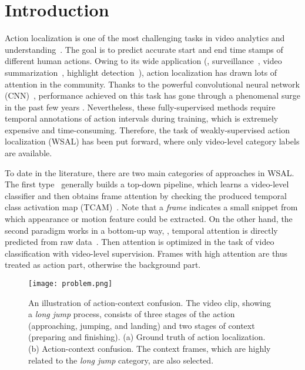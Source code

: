 \documentclass[10pt,twocolumn,letterpaper]{article}
\begin{document}
\section{Introduction}
\label{sec1}
Action localization is one of the most challenging tasks in video analytics and understanding~\cite{simonyan2014two,shou2016temporal,li2018recurrent,qiu2019learning,li2019long}.
The goal is to predict accurate start and end time stamps of different human actions.
Owing to its wide application (\eg, surveillance~\cite{vishwakarma2013survey}, video summarization~\cite{hua2005generic}, highlight detection~\cite{xiong2019less}), action localization has drawn lots of attention in the community.
Thanks to the powerful convolutional neural network (CNN)~\cite{krizhevsky2012imagenet}, performance achieved on this task has gone through a phenomenal surge in the past few years \cite{shou2016temporal,yeung2016end,dai2017temporal,xu2017r,chao2018rethinking,alwassel2018action,lin2018bsn,long2019gaussian}.
Nevertheless, these fully-supervised methods require temporal annotations of action intervals during training, which is extremely expensive and time-consuming.
Therefore, the task of weakly-supervised action localization (WSAL) has been put forward, where only video-level category labels are available.

To date in the literature, there are two main categories of approaches in WSAL.
The first type~\cite{liu2019completeness,narayan20193c,paul2018w,wang2017untrimmednets} generally builds a top-down pipeline, which learns a video-level classifier and then obtains frame attention by checking the produced temporal class activation map (TCAM)~\cite{zhou2016learning}.
Note that a \emph{frame} indicates a small snippet from which appearance or motion feature could be extracted.
On the other hand, the second paradigm works in a bottom-up way, \ie, temporal attention is directly predicted from raw data~\cite{nguyen2018weakly,nguyen2019weakly,shou2018autoloc,yuan2018marginalized}. Then attention is optimized in the task of video classification with video-level supervision.
Frames with high attention are thus treated as action part, otherwise the background part.

\begin{figure}
    \centering
    \texttt{[image: problem.png]}
    \caption{An illustration of action-context confusion. The video clip, showing a \emph{long jump} process, consists of three stages of the action (approaching, jumping, and landing) and two stages of context (preparing and finishing). (a) Ground truth of action localization. (b) Action-context confusion. The context frames, which are highly related to the \emph{long jump} category, are also selected.}
    \label{problem}
\end{figure}
\end{document}
